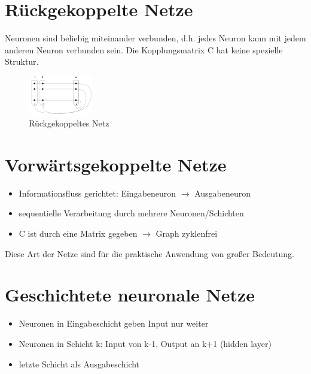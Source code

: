 \section{Rückgekoppelte Netze}
Neuronen sind beliebig miteinander verbunden, d.h. jedes Neuron kann mit jedem anderen Neuron verbunden sein. Die Kopplungsmatrix C hat keine spezielle Struktur.
\begin{figure}[h]
    \centering
    \includegraphics[width=0.25\textwidth]{img/NeuronaleArchitekturen/rueckgekoppelteNetze.png}
    \caption{Rückgekoppeltes Netz}
    \label{ch_arch_rueck}
\end{figure}

\section{Vorwärtsgekoppelte Netze}
\begin{itemize}
    \item Informationsfluss gerichtet: Eingabeneuron $\rightarrow$ Ausgabeneuron
    \item sequentielle Verarbeitung durch mehrere Neuronen/Schichten
    \item C ist durch eine Matrix gegeben $\rightarrow$ Graph zyklenfrei
\end{itemize}
Diese Art der Netze sind für die praktische Anwendung von großer Bedeutung.

\section{Geschichtete neuronale Netze}
\begin{itemize}
    \item Neuronen in Eingabeschicht geben Input nur weiter
    \item Neuronen in Schicht k: Input von k-1, Output an k+1 (hidden layer)
    \item letzte Schicht als Ausgabeschicht
\end{itemize}

